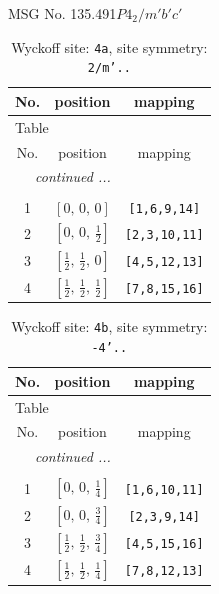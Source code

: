 \documentclass[fleqn,8pt]{jsarticle}
\begin{document}
\setcounter{MaxMatrixCols}{32}

\renewcommand{\tablename}{Table~}
\renewcommand{\figurename}{Figure~}
\begin{center}
\LARGE
MSG No. 135.491\quad$P4_{2}/m'b'c'$
\end{center}
\renewcommand{\arraystretch}{1.2}
\begin{longtable}{ccc}
\caption{Wyckoff site: {\tt 4a}, site symmetry: {\tt 2/m'..}}
 \\
 \hline \hline
No. & position & mapping \\ \hline \endfirsthead

\multicolumn{2}{l}{\tablename\ \thetable{}} \\
 \hline \hline
No. & position & mapping \\ \hline \endhead

 \hline \hline
\multicolumn{2}{r}{\footnotesize\it continued ...} \\ \endfoot

 \hline \hline
\multicolumn{2}{r}{} \\ \endlastfoot

1 & $\left[ 0,\, 0,\, 0 \right]$ & {\tt [1,6,9,14]} \\ \hline
2 & $\left[ 0,\, 0,\, \frac{1}{2} \right]$ & {\tt [2,3,10,11]} \\ \hline
3 & $\left[ \frac{1}{2},\, \frac{1}{2},\, 0 \right]$ & {\tt [4,5,12,13]} \\ \hline
4 & $\left[ \frac{1}{2},\, \frac{1}{2},\, \frac{1}{2} \right]$ & {\tt [7,8,15,16]} \\
\end{longtable}
\renewcommand{\arraystretch}{1.2}
\begin{longtable}{ccc}
\caption{Wyckoff site: {\tt 4b}, site symmetry: {\tt -4'..}}
 \\
 \hline \hline
No. & position & mapping \\ \hline \endfirsthead

\multicolumn{2}{l}{\tablename\ \thetable{}} \\
 \hline \hline
No. & position & mapping \\ \hline \endhead

 \hline \hline
\multicolumn{2}{r}{\footnotesize\it continued ...} \\ \endfoot

 \hline \hline
\multicolumn{2}{r}{} \\ \endlastfoot

1 & $\left[ 0,\, 0,\, \frac{1}{4} \right]$ & {\tt [1,6,10,11]} \\ \hline
2 & $\left[ 0,\, 0,\, \frac{3}{4} \right]$ & {\tt [2,3,9,14]} \\ \hline
3 & $\left[ \frac{1}{2},\, \frac{1}{2},\, \frac{3}{4} \right]$ & {\tt [4,5,15,16]} \\ \hline
4 & $\left[ \frac{1}{2},\, \frac{1}{2},\, \frac{1}{4} \right]$ & {\tt [7,8,12,13]} \\
\end{longtable}
\end{document}
